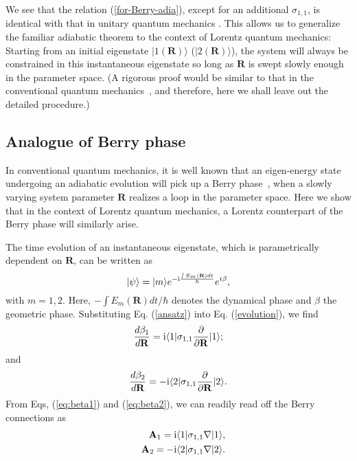 \documentclass[pra,epsfig,rotate,superscriptaddress,showpacs]{revtex4}
\begin{document}
We see that the relation (\ref{for-Berry-adia}), except for an additional $\sigma_{1,1}$, is identical with that in unitary quantum mechanics \cite{BornFock}. This allows us to generalize the familiar adiabatic theorem to the context of Lorentz quantum mechanics: Starting from an initial eigenstate $|1(\mathbf{R})\rangle$ ($|2(\mathbf{R})\rangle$), the system will always be constrained in this instantaneous eigenstate so long as $\mathbf{R}$ is swept slowly enough in the parameter space. (A rigorous proof would be similar to that in the conventional quantum mechanics~\cite{BornFock,Zhang},
and therefore, here we shall leave out the detailed procedure.)

\subsection{Analogue of Berry phase}

In conventional quantum mechanics, it is well known that an eigen-energy state undergoing an adiabatic evolution will pick up a Berry phase~\cite{Berry}, when a slowly varying system parameter $\mathbf{R}$ realizes a loop in the parameter space. Here we show that in the context of Lorentz quantum mechanics, a Lorentz counterpart of the Berry phase will similarly arise.

The time evolution of an instantaneous eigenstate, which is parametrically dependent on $\mathbf{R}$, can be written as
\begin{equation} \label{ansatz}
|\psi\rangle=|m\rangle e^{-{\text i}\frac{\int E_m(\mathbf{R}) dt}{\hbar}}e^{i\beta},
\end{equation}
with $m=1,2$. Here, $-\int E_m(\mathbf{R})dt/\hbar$ denotes the dynamical phase and $\beta$ the geometric phase. Substituting Eq. (\ref{ansatz}) into Eq. (\ref{evolution}), we find
\begin{equation}\label{eq:beta1}
\frac{d\beta_1}{d\mathbf{R}}={\text i}\langle1|\sigma_{1,1} \frac{\partial}{\partial \mathbf{R}}|1\rangle;
\end{equation}
and
\begin{equation}\label{eq:beta2}
\frac{d\beta_2}{d\mathbf{R}}=-{\text i}\langle2|\sigma_{1,1} \frac{\partial}{\partial \mathbf{R}}|2\rangle.
\end{equation}
From Eqs, (\ref{eq:beta1}) and (\ref{eq:beta2}), we can readily read off the Berry connections as
\begin{eqnarray} \label{Berry-con1}
 \mathbf{A}_1={\text i}\langle 1|\sigma_{1,1} \nabla|1\rangle, \\  \label{Berry-con2}
 \quad \mathbf{A}_2=-{\text i}\langle 2|\sigma_{1,1} \nabla|2\rangle.
\end{eqnarray}
\end{document}
